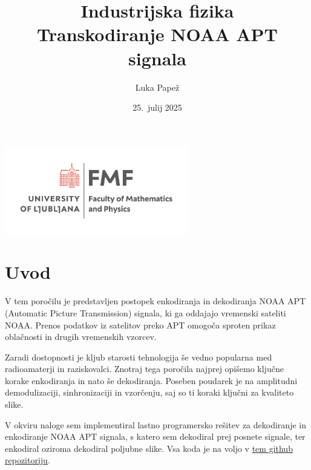 \documentclass{article}
\begin{document}
\title{Industrijska fizika \\[3mm] \large Transkodiranje NOAA APT signala}
\author{Luka Papež}
\date{25.\ julij 2025}

\begin{center}
    \includegraphics[width=8cm]{logo-fmf.png}
\end{center}

{
    \let\newpage\relax
    \maketitle
}

\newpage
\section{Uvod}
V tem poročilu je predstavljen postopek enkodiranja in dekodiranja NOAA APT (Automatic Picture Transmission) signala, ki ga oddajajo vremenski sateliti NOAA. Prenos podatkov iz satelitov preko APT omogoča sproten prikaz oblačnosti in drugih vremenskih vzorcev.

Zaradi dostopnosti je kljub starosti tehnologija še vedno popularna med radioamaterji in raziskovalci. Znotraj tega poročila najprej opišemo ključne korake enkodiranja in nato še dekodiranja. Poseben poudarek je na amplitudni demodulizaciji, sinhronizaciji in vzorčenju, saj so ti koraki ključni za kvaliteto slike.

V okviru naloge sem implementiral lastno programersko rešitev za dekodiranje in enkodiranje NOAA APT signala, s katero sem dekodiral prej posnete signale, ter enkodiral oziroma dekodiral poljubne slike. Vsa koda je na voljo v \href{https://github.com/NotNotLuka/NOAA-APT}{tem github repozitoriju}\cite{git_repo}.
\end{document}
